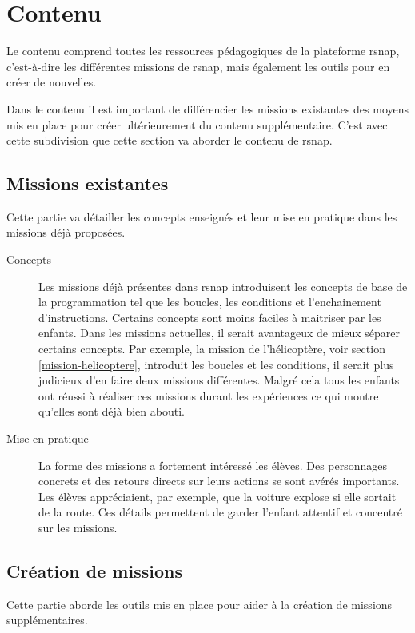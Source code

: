 \section{Contenu}
Le contenu comprend toutes les ressources pédagogiques de la plateforme \gls{rsnap}, c'est-à-dire les différentes \glspl{mission} de \gls{rsnap}, mais également les outils pour en créer de nouvelles.

Dans le contenu il est important de différencier les \glspl{mission} existantes des moyens mis en place pour créer ultérieurement du contenu supplémentaire. C'est avec cette subdivision que cette section va aborder le contenu de \gls{rsnap}.

\subsection{Missions existantes}
Cette partie va détailler les concepts enseignés et leur mise en pratique dans les \glspl{mission} déjà proposées.
\begin{description}
  \item[Concepts] Les \glspl{mission} déjà présentes dans \gls{rsnap} introduisent les concepts de base de la programmation tel que les boucles, les conditions et l'enchainement d'instructions. Certains concepts sont moins faciles à maitriser par les enfants. Dans les \glspl{mission} actuelles, il serait avantageux de mieux séparer certains concepts. Par exemple, la \gls{mission} de l'hélicoptère, voir section \ref{mission-helicoptere}, introduit les boucles et les conditions, il serait plus judicieux d'en faire deux \glspl{mission} différentes. Malgré cela tous les enfants ont réussi à réaliser ces \glspl{mission} durant les expériences ce qui montre qu'elles sont déjà bien abouti.

  \item[Mise en pratique] La forme des \glspl{mission} a fortement intéressé les élèves. Des personnages concrets et des retours directs sur leurs actions se sont avérés importants. Les élèves appréciaient, par exemple, que la voiture explose si elle sortait de la route. Ces détails permettent de garder l'enfant attentif et concentré sur les \glspl{mission}.
\end{description}

\subsection{Création de missions}
Cette partie aborde les outils mis en place pour aider à la création de \glspl{mission} supplémentaires.

